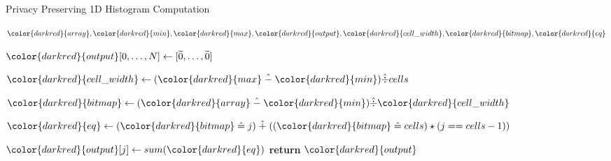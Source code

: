 \begin{algorithm}[H]
\caption{Privacy Preserving 1D Histogram Computation}\label{a:1d-histogram}
\begin{algorithmic}[1]
\renewcommand{\algorithmicrequire}{\textbf{Private Vars:}}
\Require ${\color{darkred}{array}}, {\color{darkred}{min}}, {\color{darkred}{max}}, {\color{darkred}{output}}, {\color{darkred}{cell\_width}}, {\color{darkred}{bitmap}}, {\color{darkred}{eq}}$

    \State ${\color{darkred}{output}}[0, \dots, N] \gets [\widetilde{0},\dots,\widetilde{0}]$

    \State ${\color{darkred}{cell\_width}} \gets ({\color{darkred}{max}} \hminus {\color{darkred}{min}}) \hdiv cells $

    \State ${\color{darkred}{bitmap}} \gets ({\color{darkred}{array}} \hminus {\color{darkred}{min}}) \hdiv {\color{darkred}{cell\_width}} $


        \State ${\color{darkred}{eq}} \gets ({\color{darkred}{bitmap}} \heq j) \hplus (({\color{darkred}{bitmap}} \heq cells) \hmul (j == cells - 1)) $

        \State ${\color{darkred}{output}}[j] \gets sum({\color{darkred}{eq}})$
    \EndFor
    \State \textbf{return} {${\color{darkred}{output}}$}
\EndProcedure
\end{algorithmic}
\end{algorithm}
